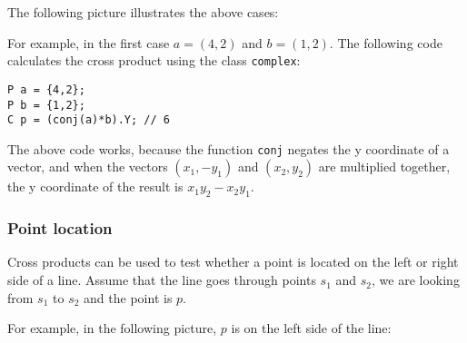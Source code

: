 The following picture illustrates the above cases:
\begin{center}
\end{center}

\noindent
For example, in the first case
$a=(4,2)$ and $b=(1,2)$.
The following code calculates the cross product
using the class \texttt{complex}:

\begin{lstlisting}
P a = {4,2};
P b = {1,2};
C p = (conj(a)*b).Y; // 6
\end{lstlisting}

The above code works, because
the function \texttt{conj} negates the y coordinate
of a vector,
and when the vectors $(x_1,-y_1)$ and $(x_2,y_2)$
are multiplied together, the y coordinate
of the result is $x_1 y_2 - x_2 y_1$.

\subsubsection{Point location}

Cross products can be used to test
whether a point is located on the left or right
side of a line.
Assume that the line goes through points
$s_1$ and $s_2$, we are looking from $s_1$
to $s_2$ and the point is $p$.

For example, in the following picture,
$p$ is on the left side of the line:
\begin{center}
\end{center}

